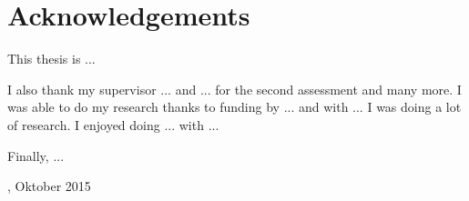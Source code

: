 \chapter*{Acknowledgements}

  This thesis is ...

  I also thank my supervisor ... and ... for the second assessment and many more. I was able to do my research thanks to funding by ... and with ... I was doing a lot of research. I enjoyed doing ... with ...

  Finally, ...

\vspace{\baselineskip}	

\noindent \thesisplace, Oktober 2015\hfill \emph{\thesisauthor}
